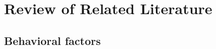 \documentclass{article}
\begin{document}
\section{ Review of Related Literature}
\subsection{Behavioral factors}
\small

\end{document}
